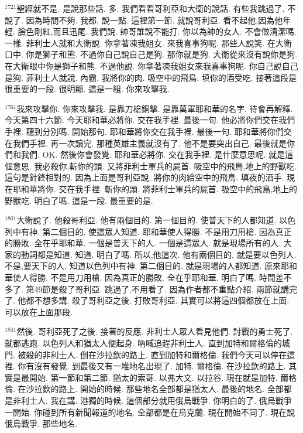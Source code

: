 \documentclass{book}
\begin{document}
$^{1721}$聖經就不是.
是說那些話.
多.
我們看看哥利亞和大衛的說話.
有些我跳過了.
不說了.
因為時間不夠.
我都.
說一點.
這裡第一節.
就說哥利亞.
看不起他,因為他年輕.
臉色剛紅,而且迅尾.
我們說.
帥哥誰說不能打.
你以為帥的女人.
不會做清潔嗎.
一樣.
菲利士人就和大衛說.
你拿著凍我姐女.
來我喜事狗呢.
那些人說笑.
在大衛口中.
你是獅子和熊.
不過你自己說自己是狗.
那你就是狗.
大衛從來沒有說你是狗.
在大衛眼中你是獅子和熊.
不過他說.
你拿著凍我姐女來我喜事狗呢.
你自己說自己是狗.
菲利士人就說.
內霸.
我將你的肉.
吸空中的飛鳥.
填你的酒受吃.
接著這段是很重要的一段.
很明顯.
這是一組.
你來攻擊我.

$^{1761}$我來攻擊你.
你來攻擊我.
是靠刀槍銅擊.
是靠萬軍耶和華的名字.
待會再解釋.
今天第四十六節.
今天耶和華必將你.
交在我手裡.
最後一句.
他必將你們交在我們手裡.
聽到分別嗎.
開始那句.
耶和華將你交在我手裡.
最後一句.
耶和華將你們交在我們手裡.
再一次讀完.
那種英雄主義就沒有了.
他不是要突出自己.
最後就是你們和我們.
OK.
然後你會發覺.
耶和華必將你.
交在我手裡.
是什麼意思呢.
就是這個意思.
我必殺你,斬你的頭.
又將菲利士軍兵的屍首.
吸空中的飛鳥,地上的野獸吃.
這句是針鋒相對的.
因為上面是哥利亞說.
將你的肉給空中的飛鳥.
填夜的酒手.
現在耶和華將你.
交在我手裡.
斬你的頭.
將菲利士軍兵的屍首.
吸空中的飛鳥,地上的野獸吃.
明白了嗎.
這是一段.
最重要的是.

$^{1801}$大衛說了.
他殺哥利亞.
他有兩個目的.
第一個目的.
使普天下的人都知道.
以色列中有神.
第二個目的.
使這眾人知道.
耶和華使人得勝.
不是用刀用槍.
因為真正的勝敗.
全在乎耶和華.
一個是普天下的人.
一個是這眾人.
就是現場所有的人.
大家的動詞都是知道.
知道.
明白了嗎.
所以,他這次.
他有兩個目的.
就是要以色列人.
不是,要天下的人.
知道以色列中有神.
第二個目的.
就是現場的人都知道.
原來耶和華使人得勝.
不是用刀用槍.
因為真正的勝敗.
全在乎耶和華.
明白了嗎.
時間差不多了.
第49節是殺了哥利亞.
跳過了,不用看了.
因為作者都不重點介紹.
兩節就講完了.
他都不想多講.
殺了哥利亞之後.
打敗哥利亞.
其實可以將這四個都放在上面.
可以放在上面那段.

$^{1841}$然後.
哥利亞死了之後.
接著的反應.
非利士人眾人看見他們.
討戰的勇士死了.
就都逃跑.
以色列人和猶太人便起身.
吶喊追趕非利士人.
直到加特和爾格倫的城門.
被殺的非利士人.
倒在沙拉欽的路上.
直到加特和爾格倫.
我們今天可以停在這裡.
你有沒有發覺.
到最後又有一堆地名出現了.
加特.
爾格倫.
在沙拉欽的路上.
其實是最開始.
第一節和第二節.
猶太的索哥.
以弗大文.
以拉谷.
現在就是加特.
爾格倫.
在沙拉欽的路上.
開始的時候.
那些地名全部都是猶太人.
最後的地名.
全部都是非利士人.
我在講.
港獨的時候.
這個部分就用俄烏戰爭.
你明白的了.
俄烏戰爭一開始.
你碰到所有新聞報道的地名.
全部都是在烏克蘭.
現在開始不同了.
現在說俄烏戰爭.
那些地名.
\end{document}
